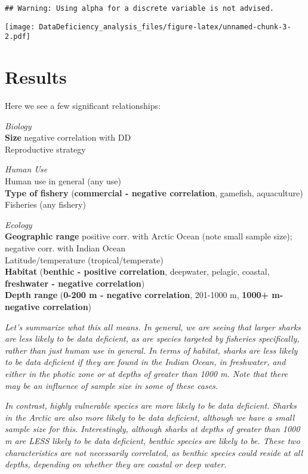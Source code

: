 \documentclass[]{article}
\begin{document}
\begin{verbatim}
## Warning: Using alpha for a discrete variable is not advised.
\end{verbatim}

\texttt{[image: DataDeficiency\_analysis\_files/figure-latex/unnamed-chunk-3-2.pdf]}

\section{Results}\label{results}

Here we see a few significant relationships:

\emph{Biology}\\
\textbf{Size} negative correlation with DD\\
Reproductive strategy

\emph{Human Use}\\
Human use in general (any use)\\
\textbf{Type of fishery} (\textbf{commercial - negative correlation},
gamefish, aquaculture)\\
Fisheries (any fishery)

\emph{Ecology}\\
\textbf{Geographic range} positive corr. with Arctic Ocean (note small
sample size); negative corr. with Indian Ocean\\
Latitude/temperature (tropical/temperate)\\
\textbf{Habitat} (\textbf{benthic - positive correlation}, deepwater,
pelagic, coastal, \textbf{freshwater - negative correlation})\\
\textbf{Depth range} (\textbf{0-200 m - negative correlation}, 201-1000
m, \textbf{1000+ m- negative correlation})

\emph{Let's summarize what this all means. In general, we are seeing
that larger sharks are less likely to be data deficient, as are species
targeted by fisheries specifically, rather than just human use in
general. In terms of habitat, sharks are less likely to be data
deficient if they are found in the Indian Ocean, in freshwater, and
either in the photic zone or at depths of greater than 1000 m. Note that
there may be an influence of sample size in some of these cases.}

\emph{In contrast, highly vulnerable species are more likely to be data
deficient. Sharks in the Arctic are also more likely to be data
deficient, although we have a small sample size for this. Interestingly,
although sharks at depths of greater than 1000 m are LESS likely to be
data deficient, benthic species are likely to be. These two
characteristics are not necessarily correlated, as benthic species could
reside at all depths, depending on whether they are coastal or deep
water.}
\end{document}
